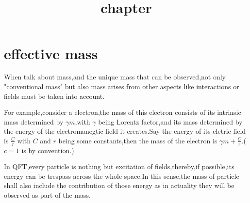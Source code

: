 \documentclass[a4paper]{article}
\begin{document}
\title{chapter}
\date{ }
\maketitle
\section{effective mass}
\par When talk about mass,and the unique mass that can be observed,not only "conventional mass" but also mass arises from other aspects like interactions or fields must be taken into account.\par For example,consider a electron,the mass of this electron consists of its intrinsic mass determined by $\gamma m$,with $\gamma$ being Lorentz factor,and its mass determined by the energy of the electromanegtic field it creates.Say the energy of its eletric field is $\frac{C}{r}$ with $C$ and $r$ being some constants,then the mass of the electron is $\gamma m+\frac{C}{r}$.($c=1$ is by convention.)\par In QFT,every particle is nothing but excitation of fields,thereby,if possible,its energy can be trespass across the whole space.In this sense,the mass of particle shall also include the contribution of those energy as in actuality they will be observed as part of the mass.
\end{document}

